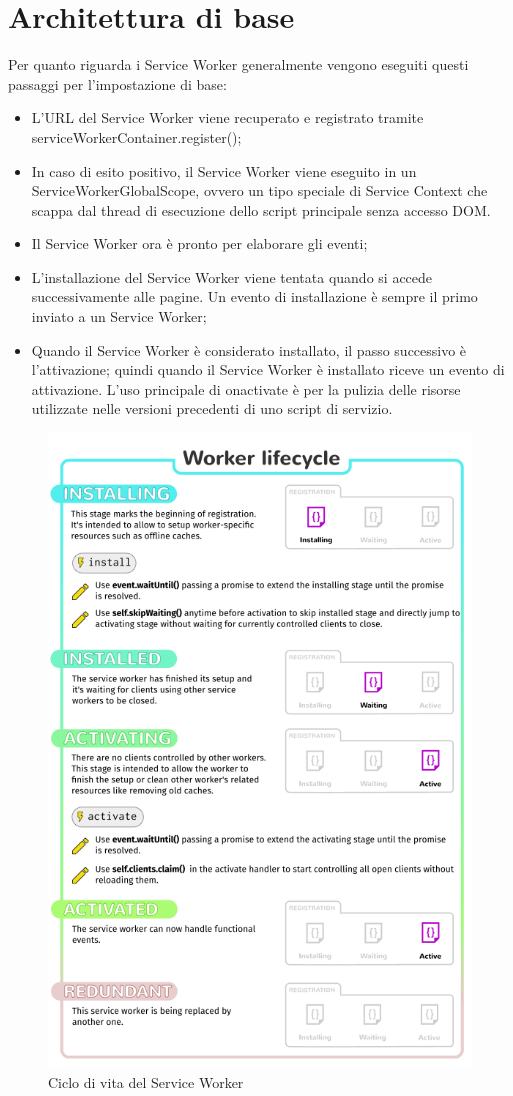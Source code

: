 \documentclass[italian]{article}
\begin{document}
\section{Architettura di base}
Per quanto riguarda i Service Worker generalmente vengono eseguiti questi passaggi per l'impostazione di base:
\begin{itemize}
	\item L'URL del Service Worker viene recuperato e registrato tramite serviceWorkerContainer.register();
	\item In caso di esito positivo, il Service Worker viene eseguito in un ServiceWorkerGlobalScope, ovvero un tipo speciale di Service Context che scappa dal thread di esecuzione dello script principale senza accesso DOM.
	\item Il Service Worker ora è pronto per elaborare gli eventi;
	\item L'installazione del Service Worker viene tentata quando si accede successivamente alle pagine. Un evento di installazione è sempre il primo inviato a un Service Worker;
	\item Quando il Service Worker  è considerato installato, il passo successivo è l'attivazione; quindi quando il Service Worker è installato riceve un evento di attivazione. L'uso principale di onactivate è per la pulizia delle risorse utilizzate nelle versioni precedenti di uno script di servizio.
\end{itemize}
\begin{figure}[h]
	\centering
	\includegraphics[width=0.6\linewidth]{SwLifecycle}
	\caption{Ciclo di vita del Service Worker}
	\label{fig:Ciclo di vita del Service Worker}
\end{figure}
\pagebreak
\newpage
\end{document}
